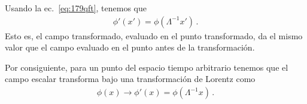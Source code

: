 Usando la ec.~\eqref{eq:179qft}, tenemos que
\begin{align}
    \phi'(x')=\phi(\Lambda^{-1}x')\,.
\end{align}
Esto es, el campo transformado, evaluado en el punto transformado, da el mismo valor que el campo evaluado en el punto antes de la transformación. 

\begin{frame}

Por consiguiente, para un punto del espacio tiempo arbitrario tenemos
que el campo escalar transforma bajo una transformación de Lorentz como
\begin{align}
  \label{eq:scalarlorentz}
 \phi(x)\to  \phi'(x)=\phi(\Lambda^{-1}x)\,.
\end{align}
\end{frame}

